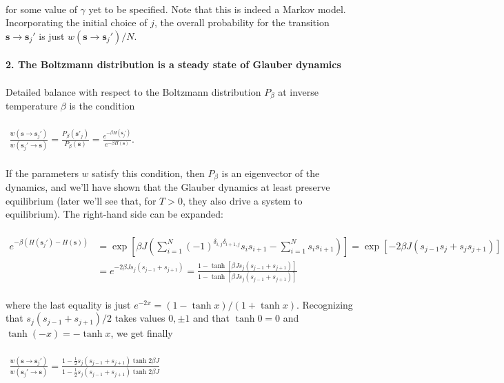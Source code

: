 \documentclass[]{article}
\begin{document}
\\
for some value of $\gamma$ yet to be specified. Note that this is indeed a Markov model. Incorporating the initial choice of $j$, the overall probability for the transition $\mathbf{s}\rightarrow\mathbf{s}_j'$ is just $w(\mathbf{s}\rightarrow\mathbf{s}_j')/N$.\\
\\
\textbf{2. The Boltzmann distribution is a steady state of Glauber dynamics}\\
\\
Detailed balance with respect to the Boltzmann distribution $P_\beta$ at inverse temperature $\beta$ is the condition\\
\\
$\begin{aligned}
\frac{w(\mathbf{s}\rightarrow\mathbf{s}_j')}{w(\mathbf{s}_j'\rightarrow\mathbf{s})}=\frac{P_\beta(\mathbf{s}'_j)}{P_\beta(\mathbf{s})}=\frac{e^{-\beta H(\mathbf{s}_j')}}{e^{-\beta H(\mathbf{s})}}.
\end{aligned}$\\
\\
If the parameters $w$ satisfy this condition, then $P_\beta$ is an eigenvector of the dynamics, and we'll have shown that the Glauber dynamics at least preserve equilibrium (later we'll see that, for $T>0$, they also drive a system to equilibrium). The right-hand side can be expanded:\\
\\
$\begin{aligned}
e^{-\beta(H(\mathbf{s}_j')-H(\mathbf{s}))}&=\exp\left[\beta J\left(\sum_{i=1}^N(-1)^{\delta_{i,j}\delta_{i+1,j}}s_is_{i+1}-\sum_{i=1}^Ns_is_{i+1}\right)\right]=\exp\left[-2\beta J\left(s_{j-1}s_j+s_js_{j+1}\right)\right]\\
&=e^{-2\beta Js_j(s_{j-1}+s_{j+1})}=\frac{1-\tanh \left[\beta Js_j(s_{j-1}+s_{j+1})\right]}{1-\tanh \left[\beta Js_j(s_{j-1}+s_{j+1})\right]}
\end{aligned}$\\
\\
where the last equality is just $e^{-2x}=(1-\tanh x)/(1+\tanh x)$. Recognizing that $s_j(s_{j-1}+s_{j+1})/2$ takes values $0,\pm 1$ and that $\tanh 0=0$ and $\tanh (-x)=-\tanh x$, we get finally\\
\\
$\begin{aligned}
\frac{w(\mathbf{s}\rightarrow\mathbf{s}_j')}{w(\mathbf{s}_j'\rightarrow\mathbf{s})}=\frac{1-\frac{1}{2}s_j(s_{j-1}+s_{j+1})\tanh 2\beta J}{1-\frac{1}{2}s_j(s_{j-1}+s_{j+1})\tanh2\beta J}
\end{aligned}$\\
\end{document}
